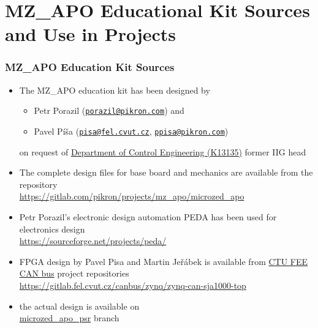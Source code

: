 \documentclass{beamer}
\begin{document}
\section{MZ\_APO Educational Kit Sources and Use in Projects}


\begin{frame}
\frametitle{MZ\_APO Education Kit Sources}

\begin{itemize}
\item The MZ\_APO education kit has been designed by
\begin{itemize}
\item Petr Porazil
  (\href{mailto:porazil@pikron.com}{\nolinkurl{porazil@pikron.com}}) and
\item Pavel Píša
  (\href{mailto:pisa@cmp.felk.cvut.cz}{\nolinkurl{pisa@fel.cvut.cz}},
  \href{mailto:ppisa@pikron.com}{\nolinkurl{ppisa@pikron.com}}) \\
\end{itemize}
  on request of \href{https://dce.fel.cvut.cz/}{Department of Control
  Engineering (K13135)} former IIG head
\item The complete design files for base board and mechanics are available
  from the repository \\
  \href{https://gitlab.com/pikron/projects/mz_apo/microzed_apo}{https://gitlab.com/pikron/projects/mz\_apo/microzed\_apo}
\item Petr Porazil's electronic design automation PEDA has been used for
  electronics design \\
  \url{https://sourceforge.net/projects/peda/}
\item FPGA design by Pavel Pisa and Martin Jeřábek is available from
  \href{http://canbus.pages.fel.cvut.cz/}{CTU FEE CAN bus} project repositories \\
  \small{\url{https://gitlab.fel.cvut.cz/canbus/zynq/zynq-can-sja1000-top}}
\item the actual design is available on \\
  \href{https://gitlab.fel.cvut.cz/canbus/zynq/zynq-can-sja1000-top/-/commits/microzed_apo_psr}{microzed\_apo\_psr}  branch
\end{itemize}

\end{frame}
\end{document}
